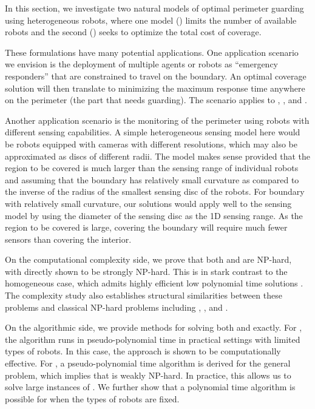 In this section, we investigate two natural models of optimal perimeter 
guarding using heterogeneous robots, where one model (\opglr) limits 
the number of available robots and the second (\opgmc) seeks to 
optimize the total cost of coverage. 

These formulations have many potential applications. One application 
scenario we envision is the deployment of multiple agents or robots 
as ``emergency responders'' that are constrained to travel on the 
boundary. An optimal coverage solution will then translate to minimizing 
the maximum response time anywhere on the perimeter (the part that 
needs guarding). The scenario applies to \opg, \opglr, and \opgmc. 

Another application scenario is the monitoring of the perimeter 
using robots with different sensing capabilities. A simple heterogeneous 
sensing model here would be robots equipped with cameras with different 
resolutions, which may also be approximated as discs of different radii. 
The model makes sense provided that the region to be covered is much 
larger than the sensing range of individual robots and assuming that the 
boundary has relatively small curvature as compared to the inverse of the 
radius of the smallest sensing disc of the robots. For boundary with 
relatively small curvature, our solutions would apply well to the sensing 
model by using the diameter of the sensing disc as the 1D sensing range. 
As the region to be covered is large, covering the boundary will require
much fewer sensors than covering the interior. 


On the computational complexity 
side, we prove that both \opglr and \opgmc are NP-hard, with \opglr 
directly shown to be strongly NP-hard. This is in stark contrast to 
the homogeneous case, which admits highly efficient low polynomial 
time solutions \cite{fenghangaoyu2019efficient}. The complexity study also 
establishes structural similarities between these problems and 
classical NP-hard problems including \tpart, \ttkp, and \subsetsum.

On the algorithmic side, we provide methods for solving both \opglr 
and \opgmc exactly. For \opglr, the algorithm runs in pseudo-polynomial 
time in practical settings with limited types of robots. In 
this case, the approach is shown to be computationally effective. 
For \opgmc, a pseudo-polynomial time algorithm is derived for the 
general problem, which implies that \opgmc is weakly NP-hard. In 
practice, this allows us to solve large instances of \opgmc. We 
further show that a polynomial time algorithm is possible for 
\opgmc when the types of robots are fixed. 

